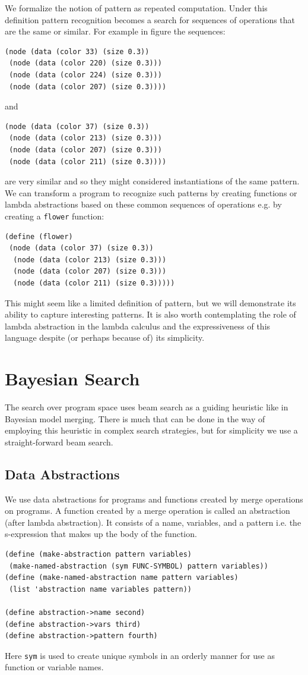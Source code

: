 \documentclass[a4paper,10pt]{article}
\begin{document}
We formalize the notion of pattern as repeated computation.  Under this definition pattern recognition becomes a search for sequences of operations that are the same or similar.  For example in figure \cite{initProgram} the sequences:
\begin{verbatim}
(node (data (color 33) (size 0.3))
 (node (data (color 220) (size 0.3)))
 (node (data (color 224) (size 0.3)))
 (node (data (color 207) (size 0.3))))
\end{verbatim}
and
\begin{verbatim}
(node (data (color 37) (size 0.3))
 (node (data (color 213) (size 0.3)))
 (node (data (color 207) (size 0.3)))
 (node (data (color 211) (size 0.3))))
\end{verbatim}
are very similar and so they might considered instantiations of the same pattern.  We can transform a program to recognize such patterns by creating functions or lambda abstractions based on these common sequences of operations e.g. by creating a \texttt{flower} function:
\begin{verbatim}
(define (flower)
 (node (data (color 37) (size 0.3))
  (node (data (color 213) (size 0.3)))
  (node (data (color 207) (size 0.3)))
  (node (data (color 211) (size 0.3)))))
\end{verbatim}
This might seem like a limited definition of pattern, but we will demonstrate its ability to capture interesting patterns.  It is also worth contemplating the role of lambda abstraction in the lambda calculus and the expressiveness of this language despite (or perhaps because of) its simplicity.


\section{Bayesian Search}
The search over program space uses beam search as a guiding heuristic like in Bayesian model merging.  There is much that can be done in the way of employing this heuristic in complex search strategies, but for simplicity we use a straight-forward beam search.  

\subsection{Data Abstractions}
We use data abstractions for programs and functions created by merge operations on programs.  A function created by a merge operation is called an abstraction (after lambda abstraction).  It consists of a name, variables, and a pattern i.e. the s-expression that makes up the body of the function.  
\begin{verbatim}
(define (make-abstraction pattern variables)
 (make-named-abstraction (sym FUNC-SYMBOL) pattern variables))
(define (make-named-abstraction name pattern variables)
 (list 'abstraction name variables pattern))

(define abstraction->name second)
(define abstraction->vars third)
(define abstraction->pattern fourth)
\end{verbatim}
Here \texttt{sym} is used to create unique symbols in an orderly manner for use as function or variable names.
\end{document}
